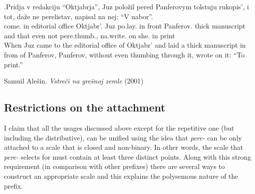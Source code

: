 \exg.\label{ex:perelistat}Pridja v redakciju ``Oktjabrja'', Juz polo\v{z}il pered Panferovym tolstuju rukopis', i tot, da\v{z}e ne perelistav, napisal na nej: ``V nabor''.\\
come. in {editorial office} Oktjabr'. Juz po.lay. {in front} Panferov. thick manuscript and that even not pere.thumb., na.write. on she. in 	print\\
\vspace{0.5em}
When Juz came to the editorial office of Oktjabr' and laid a thick manuscript in from of Panferov, Panferov, without even thumbing through it, wrote on it: ``To print.''\\
\begin{flushright}
\vspace{-0.5em}
Samuil Ale\v{s}in. \textit{Vstre\v{c}i na gre\v{s}noj zemle} (2001) 
\end{flushright}




\subsection{Restrictions on the attachment}
I claim that all the usages discussed above except for the repetitive one (but including the distributive), can be unified using the idea that \textit{pere-} can be only attached to a scale that is closed and non-binary. In other words, the scale that \textit{pere-} selects for must contain at least three distinct points. Along with this strong requirement (in comparison with other prefixes) there are several ways to construct an appropriate scale and this explains the polysemous nature of the prefix. 

